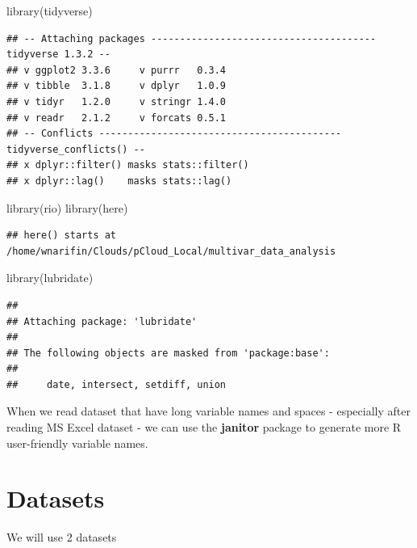 \documentclass[
  10pt,
]{krantz}
\newenvironment{Shaded}{\begin{snugshade}}{\end{snugshade}}
\newcommand{\FunctionTok}[1]{\textcolor[rgb]{0.00,0.00,0.00}{#1}}
\newcommand{\NormalTok}[1]{#1}
\begin{document}
\begin{Shaded}
\begin{Highlighting}[]
\FunctionTok{library}\NormalTok{(tidyverse)}
\end{Highlighting}
\end{Shaded}

\begin{verbatim}
## -- Attaching packages --------------------------------------- tidyverse 1.3.2 --
## v ggplot2 3.3.6     v purrr   0.3.4
## v tibble  3.1.8     v dplyr   1.0.9
## v tidyr   1.2.0     v stringr 1.4.0
## v readr   2.1.2     v forcats 0.5.1
## -- Conflicts ------------------------------------------ tidyverse_conflicts() --
## x dplyr::filter() masks stats::filter()
## x dplyr::lag()    masks stats::lag()
\end{verbatim}

\begin{Shaded}
\begin{Highlighting}[]
\FunctionTok{library}\NormalTok{(rio)}
\FunctionTok{library}\NormalTok{(here)}
\end{Highlighting}
\end{Shaded}

\begin{verbatim}
## here() starts at /home/wnarifin/Clouds/pCloud_Local/multivar_data_analysis
\end{verbatim}

\begin{Shaded}
\begin{Highlighting}[]
\FunctionTok{library}\NormalTok{(lubridate)}
\end{Highlighting}
\end{Shaded}

\begin{verbatim}
## 
## Attaching package: 'lubridate'
## 
## The following objects are masked from 'package:base':
## 
##     date, intersect, setdiff, union
\end{verbatim}

When we read dataset that have long variable names and spaces - especially after reading MS Excel dataset - we can use the \textbf{janitor} package to generate more R user-friendly variable names.

\hypertarget{datasets}{%
\section{Datasets}\label{datasets}}

We will use 2 datasets
\end{document}
